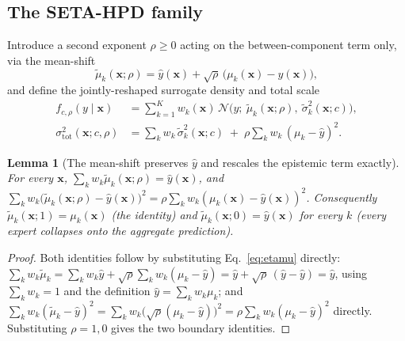 \documentclass[10pt,twocolumn,a4paper]{article}
\newtheorem{lemma}{Lemma}
\begin{document}
\subsection{The SETA-HPD family}
Introduce a second exponent $\rho\ge0$ acting on the between-component term only, via the mean-shift
\begin{equation}
\tilde\mu_k(\bm x;\rho) = \hat y(\bm x) + \sqrt{\rho}\,\big(\mu_k(\bm x)-\hat y(\bm x)\big),
\label{eq:etamu}
\end{equation}
and define the jointly-reshaped surrogate density and total scale
\begin{align}
f_{c,\rho}(y\mid\bm x) &= \sum_{k=1}^K w_k(\bm x)\,\mathcal N\big(y;\ \tilde\mu_k(\bm x;\rho),\ \tilde\sigma_k^2(\bm x;c)\big), \label{eq:fcrho}\\
\sigma_{\mathrm{tot}}^2(\bm x;c,\rho) &= \sum_k w_k\,\tilde\sigma_k^2(\bm x;c) \;+\; \rho\sum_k w_k\,(\mu_k-\hat y)^2. \label{eq:sigmatotrho}
\end{align}

\begin{lemma}[The mean-shift preserves $\hat y$ and rescales the epistemic term exactly]
\label{lem:etashift}
For every $\bm x$, $\sum_k w_k\tilde\mu_k(\bm x;\rho) = \hat y(\bm x)$, and
$\sum_k w_k\big(\tilde\mu_k(\bm x;\rho)-\hat y(\bm x)\big)^2 = \rho\sum_k w_k(\mu_k(\bm x)-\hat y(\bm x))^2$.
Consequently $\tilde\mu_k(\bm x;1)=\mu_k(\bm x)$ (the identity) and $\tilde\mu_k(\bm x;0)=\hat y(\bm x)$
for every $k$ (every expert collapses onto the aggregate prediction).
\end{lemma}
\begin{proof}
Both identities follow by substituting Eq.~\eqref{eq:etamu} directly:
$\sum_k w_k\tilde\mu_k = \sum_k w_k\hat y + \sqrt\rho\sum_k w_k(\mu_k-\hat y) = \hat y + \sqrt\rho\,(\hat y - \hat y) = \hat y$,
using $\sum_k w_k=1$ and the definition $\hat y=\sum_k w_k\mu_k$; and
$\sum_k w_k(\tilde\mu_k-\hat y)^2 = \sum_k w_k\big(\sqrt\rho(\mu_k-\hat y)\big)^2 = \rho\sum_k w_k(\mu_k-\hat y)^2$
directly. Substituting $\rho=1,0$ gives the two boundary identities.
\end{proof}
\end{document}
